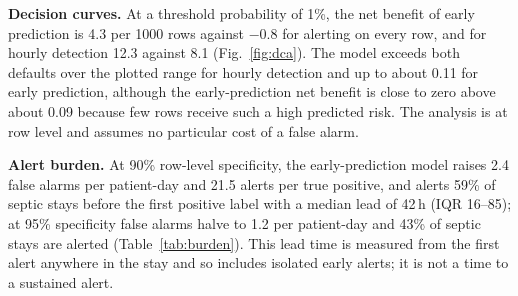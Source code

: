 \documentclass[preprint,12pt]{elsarticle}
\begin{document}
\textbf{Decision curves.} At a threshold probability of 1\%, the net benefit of early prediction is 4.3 per 1000 rows against $-0.8$ for alerting on every row, and for hourly detection 12.3 against 8.1 (Fig.~\ref{fig:dca}). The model exceeds both defaults over the plotted range for hourly detection and up to about 0.11 for early prediction, although the early-prediction net benefit is close to zero above about 0.09 because few rows receive such a high predicted risk. The analysis is at row level and assumes no particular cost of a false alarm.

\textbf{Alert burden.} At 90\% row-level specificity, the early-prediction model raises 2.4 false alarms per patient-day and 21.5 alerts per true positive, and alerts 59\% of septic stays before the first positive label with a median lead of 42\,h (IQR 16--85); at 95\% specificity false alarms halve to 1.2 per patient-day and 43\% of septic stays are alerted (Table~\ref{tab:burden}). This lead time is measured from the first alert anywhere in the stay and so includes isolated early alerts; it is not a time to a sustained alert.
\end{document}
